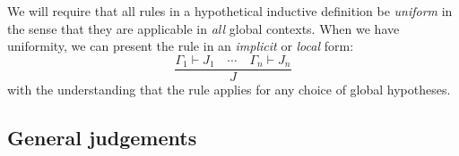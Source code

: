 \begin{defin}
    We will require that all rules in a hypothetical inductive definition be \emph{uniform} in the sense that they are applicable in \emph{all} global contexts. When we have uniformity, we can present the rule in an \emph{implicit} or \emph{local} form:
    $$
        \frac{\Gamma_1 \vdash J_1 \quad \cdots \quad \Gamma_n \vdash J_n}{J}
    $$
    with the understanding that the rule applies for any choice of global hypotheses.
\end{defin}




\subsection{General judgements}












